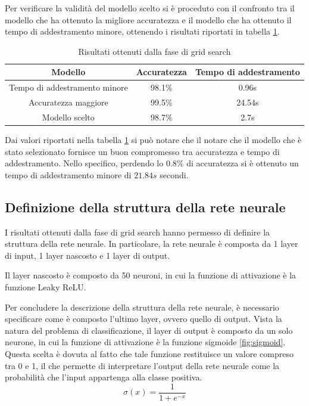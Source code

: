 Per verificare la validità del modello scelto si è proceduto con il confronto tra
il modello che ha ottenuto la migliore accuratezza e il modello che ha ottenuto
il tempo di addestramento minore, ottenendo i risultati riportati in tabella \ref{tab:ris-grid-search}.
\begin{table}[ht]
    \centering
    \begin{tabular}{|c|c|c|}
        \hline
        \textbf{Modello}              & \textbf{Accuratezza} & \textbf{Tempo di addestramento} \\
        \hline
        Tempo di addestramento minore & 98.1\%               & 0.96s                           \\
        \hline
        Accuratezza maggiore          & 99.5\%               & 24.54s                          \\
        \hline
        Modello scelto                & 98.7\%               & 2.7s                            \\
        \hline
    \end{tabular}
    \caption{Risultati ottenuti dalla fase di grid search}
    \label{tab:ris-grid-search}
\end{table}

Dai valori riportati nella tabella \ref{tab:ris-grid-search} si può notare che il
notare che il modello che è stato selezionato fornisce un buon compromesso tra
accuratezza e tempo di addestramento. Nello specifico, perdendo lo $0.8\%$ di
accuratezza si è ottenuto un tempo di addestramento minore di $21.84s$ secondi. 

\subsection*{Definizione della struttura della rete neurale}
I risultati ottenuti dalla fase di grid search hanno permesso di definire la
struttura della rete neurale. In particolare, la rete neurale è composta da 1
layer di input, 1 layer nascosto e 1 layer di output. 

Il layer nascosto è composto da 50 neuroni, in cui la funzione di attivazione è 
la funzione Leaky ReLU.

Per concludere la descrizione della struttura della rete neurale, è necessario
specificare come è composto l'ultimo layer, ovvero quello di output. Vista la
natura del problema di classificazione, il layer di output è composto da un solo
neurone, in cui la funzione di attivazione è la funzione sigmoide \ref{fig:sigmoid}. 
Questa scelta è dovuta al fatto che tale funzione restituisce un valore compreso 
tra 0 e 1, il che permette di interpretare l'output della rete neurale come la
probabilità che l'input appartenga alla classe positiva.
\begin{equation}
    \sigma(x) = \frac{1}{1 + e^{-x}}
\end{equation}

